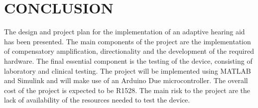 \documentclass[10pt,twocolumn]{witseiepaper}
\begin{document}
\section{CONCLUSION}
The design and project plan for the implementation of an adaptive hearing aid has been presented. The main components of the project are the implementation of compensatory amplification, directionality and the development of the required hardware. The final essential component is the testing of the device, consisting of laboratory and clinical testing. The project will be implemented using MATLAB and Simulink and will make use of an Arduino Due microcontroller. The overall cost of the project is expected to be R1528. The main risk to the project are the lack of availability of the resources needed to test the device.
\balance


\end{document}
